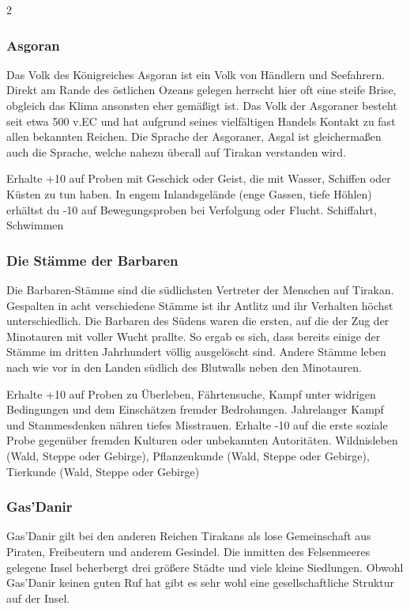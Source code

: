 {\begin{multicols*}{2}
        \subsubsection*{Asgoran}
        Das Volk des Königreiches Asgoran ist ein Volk von Händlern und Seefahrern. Direkt am Rande des östlichen Ozeans gelegen herrscht hier oft eine steife Brise, obgleich das Klima ansonsten eher gemäßigt ist. Das Volk der Asgoraner besteht seit etwa 500 v.EC und hat aufgrund seines vielfältigen Handels Kontakt zu fast allen bekannten Reichen. Die Sprache der Asgoraner, Asgal ist gleichermaßen auch die Sprache, welche nahezu überall auf Tirakan verstanden wird.

        \abstammungspielwertebox
        {Erhalte +10 auf Proben mit Geschick oder Geist, die mit Wasser, Schiffen oder Küsten zu tun haben.}
        {In engem Inlandsgelände (enge Gassen, tiefe Höhlen) erhältst du -10 auf Bewegungsproben bei Verfolgung oder Flucht.}
        {Schiffahrt, Schwimmen}

        \subsubsection*{Die Stämme der Barbaren}
        Die Barbaren-Stämme sind die südlichsten Vertreter der Menschen auf Tirakan. Gespalten in acht verschiedene Stämme ist ihr Antlitz und ihr Verhalten höchst unterschiedlich. Die Barbaren des Südens waren die ersten, auf die der Zug der Minotauren mit voller Wucht prallte. So ergab es sich, dass bereits einige der Stämme im dritten Jahrhundert völlig ausgelöscht sind. Andere Stämme leben nach wie vor in den Landen südlich des Blutwalls neben den Minotauren.

        \abstammungspielwertebox
        {Erhalte +10 auf Proben zu Überleben, Fährtensuche, Kampf unter widrigen Bedingungen und dem Einschätzen fremder Bedrohungen.}
        {Jahrelanger Kampf und Stammesdenken nähren tiefes Misstrauen. Erhalte -10 auf die erste soziale Probe gegenüber fremden Kulturen oder unbekannten Autoritäten.}
        {Wildnisleben (Wald, Steppe oder Gebirge), Pflanzenkunde (Wald, Steppe oder Gebirge), Tierkunde (Wald, Steppe oder Gebirge)}

        \subsubsection*{Gas'Danir}
        Gas'Danir gilt bei den anderen Reichen Tirakans als lose Gemeinschaft aus Piraten, Freibeutern und anderem Gesindel. Die inmitten des Felsenmeeres gelegene Insel beherbergt drei größere Städte und viele kleine Siedlungen. Obwohl Gas'Danir keinen guten Ruf hat gibt es sehr wohl eine gesellschaftliche Struktur auf der Insel.


\end{multicols*}}
